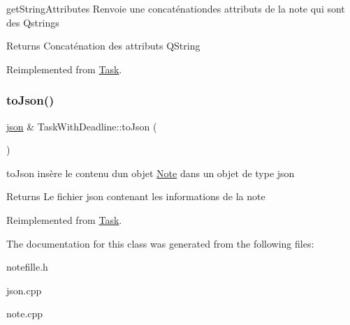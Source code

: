 get\+String\+Attributes Renvoie une concaténationdes attributs de la note qui sont des Qstrings 

\begin{DoxyReturn}{Returns}
Concaténation des attributs Q\+String 
\end{DoxyReturn}


Reimplemented from \hyperlink{classTask_a410f65f8d06198e75d8faec574827726}{Task}.

\mbox{\label{classTaskWithDeadline_a7ded765b2eb469cb31538bd52f75ae6e}} 
\subsubsection{\texorpdfstring{to\+Json()}{toJson()}}
{\footnotesize\ttfamily \hyperlink{classnlohmann_1_1basic__json}{json} \& Task\+With\+Deadline\+::to\+Json (\begin{DoxyParamCaption}{ }\end{DoxyParamCaption})\hspace{0.3cm}{\ttfamily [virtual]}}



to\+Json insère le contenu d\textquotesingle{}un objet \hyperlink{classNote}{Note} dans un objet de type json 

\begin{DoxyReturn}{Returns}
Le fichier json contenant les informations de la note 
\end{DoxyReturn}


Reimplemented from \hyperlink{classTask_af20f0085e2426cbf64955a03d8920400}{Task}.



The documentation for this class was generated from the following files\+:\begin{DoxyCompactItemize}
\item 
notefille.\+h\item 
json.\+cpp\item 
note.\+cpp\end{DoxyCompactItemize}
